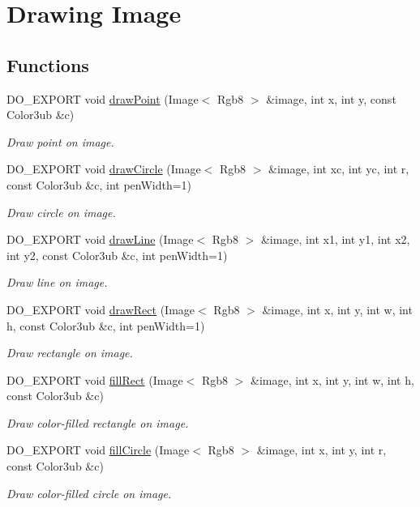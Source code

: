 \hypertarget{group___image_drawing}{\section{Drawing Image}
\label{group___image_drawing}
}
\subsection*{Functions}
\begin{DoxyCompactItemize}
\item 
D\-O\-\_\-\-E\-X\-P\-O\-R\-T void \hyperlink{group___image_drawing_gac01a694d079363a4ee4e0c06baaddcb7}{draw\-Point} (Image$<$ Rgb8 $>$ \&image, int x, int y, const Color3ub \&c)
\begin{DoxyCompactList}\small\item\em Draw point on image. \end{DoxyCompactList}\item 
D\-O\-\_\-\-E\-X\-P\-O\-R\-T void \hyperlink{group___image_drawing_gaf99b9267edc72d74cda95f33baaa7e2a}{draw\-Circle} (Image$<$ Rgb8 $>$ \&image, int xc, int yc, int r, const Color3ub \&c, int pen\-Width=1)
\begin{DoxyCompactList}\small\item\em Draw circle on image. \end{DoxyCompactList}\item 
D\-O\-\_\-\-E\-X\-P\-O\-R\-T void \hyperlink{group___image_drawing_ga451047caac18dd6bfb59bdc9b983eed1}{draw\-Line} (Image$<$ Rgb8 $>$ \&image, int x1, int y1, int x2, int y2, const Color3ub \&c, int pen\-Width=1)
\begin{DoxyCompactList}\small\item\em Draw line on image. \end{DoxyCompactList}\item 
D\-O\-\_\-\-E\-X\-P\-O\-R\-T void \hyperlink{group___image_drawing_ga6c2140a7a5e0cf130a3dd51abe4376ad}{draw\-Rect} (Image$<$ Rgb8 $>$ \&image, int x, int y, int w, int h, const Color3ub \&c, int pen\-Width=1)
\begin{DoxyCompactList}\small\item\em Draw rectangle on image. \end{DoxyCompactList}\item 
D\-O\-\_\-\-E\-X\-P\-O\-R\-T void \hyperlink{group___image_drawing_gafe36fdf2a8b63bc7fd18457c28064346}{fill\-Rect} (Image$<$ Rgb8 $>$ \&image, int x, int y, int w, int h, const Color3ub \&c)
\begin{DoxyCompactList}\small\item\em Draw color-\/filled rectangle on image. \end{DoxyCompactList}\item 
D\-O\-\_\-\-E\-X\-P\-O\-R\-T void \hyperlink{group___image_drawing_gae92bc8aef0c29edc577c531d505b04bb}{fill\-Circle} (Image$<$ Rgb8 $>$ \&image, int x, int y, int r, const Color3ub \&c)
\begin{DoxyCompactList}\small\item\em Draw color-\/filled circle on image. \end{DoxyCompactList}\end{DoxyCompactItemize}


